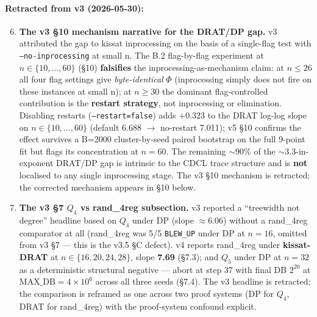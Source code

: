 \documentclass[11pt,a4paper]{article}
\theoremstyle{remark}
\begin{document}
\paragraph{Retracted from v3 (2026-05-30):}
\begin{enumerate}\setcounter{enumi}{5}
\item \textbf{The v3 \S10 mechanism narrative for the DRAT/DP gap.} v3
attributed the gap to kissat inprocessing on the basis of a single-flag
test with \texttt{--no-inprocessing} at small n. The B.2 flag-by-flag
experiment at $n \in \{10, \ldots, 60\}$ (\S10) \textbf{falsifies} the
inprocessing-as-mechanism claim: at $n \le 26$ all four flag settings
give \emph{byte-identical} $\Phi$ (inprocessing simply does not fire on
these instances at small n); at $n \ge 30$ the dominant flag-controlled
contribution is the \textbf{restart strategy}, not inprocessing or
elimination. Disabling restarts (\texttt{--restart=false}) adds $+0.323$
to the DRAT log-log slope on $n \in \{10, \ldots, 60\}$ (default 6.688
$\to$ no-restart 7.011); v5 \S10 confirms the effect survives a B=2000
cluster-by-seed paired bootstrap on the full 9-point fit but flags its
concentration at $n=60$. The remaining $\sim$90\% of the $\sim$3.3-in-exponent
DRAT/DP gap is intrinsic to the CDCL trace structure and is \textbf{not}
localised to any single inprocessing stage. The v3 \S10 mechanism is
retracted; the corrected mechanism appears in \S10 below.

\item \textbf{The v3 \S7 $Q_4$ vs rand\_4reg subsection.} v3 reported a
``treewidth not degree'' headline based on $Q_4$ under DP (slope $\approx
6.06$) without a rand\_4reg comparator at all (rand\_4reg was 5/5
\texttt{BLEW\_UP} under DP at $n=16$, omitted from v3 \S7 --- this is the
v3.5 \S C defect). v4 reports rand\_4reg under \textbf{kissat-DRAT} at
$n \in \{16, 20, 24, 28\}$, slope \textbf{7.69} (\S7.3); and $Q_5$ under
DP at $n=32$ as a deterministic structural negative --- abort at step 37
with final DB $2^{20}$ at $\mathrm{MAX\_DB} = 4 \times 10^6$ across all
three seeds (\S7.4). The v3 headline is retracted; the comparison is
reframed as one across two proof systems (DP for $Q_4$, DRAT for
rand\_4reg) with the proof-system confound explicit.
\end{enumerate}
\end{document}
